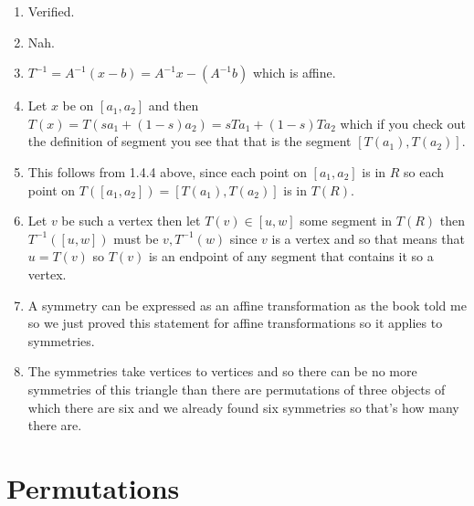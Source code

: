 \documentclass[11pt, oneside]{article}   	%
\newcommand{\inv}{^{-1}}
\newcommand{\be}{\begin{enumerate}}
\newcommand{\ee}{\end{enumerate}}
\begin{document}
\be
\item Verified.
\item Nah.
\item $T\inv = A\inv(x-b) = A\inv x - (A\inv b)$ which is affine.
\item Let $x$ be on $[a_1, a_2]$ and then $T(x) = T(sa_1 + (1-s)a_2) = sTa_1 + (1-s)Ta_2$ which if you check out the definition of segment you see that that is the segment $[T(a_1), T(a_2)]$.
\item This follows from 1.4.4 above, since each point on $[a_1, a_2]$ is in $R$ so each point on $T([a_1, a_2]) = [T(a_1), T(a_2)]$ is in $T(R)$.
\item Let $v$ be such a vertex then let $T(v) \in [u, w]$ some segment in $T(R)$ then $T\inv([u, w])$ must be $v, T\inv(w)$ since $v$ is a vertex and so that means that $u=T(v)$ so $T(v)$ is an endpoint of any segment that contains it so a vertex.
\item A symmetry can be expressed as an affine transformation as the book told me so we just proved this statement for affine transformations so it applies to symmetries.
\item The symmetries take vertices to vertices and so there can be no more symmetries of this triangle than there are permutations of three objects of which there are six and we already found six symmetries so that's how many there are.
\ee

\section{Permutations}
\end{document}
